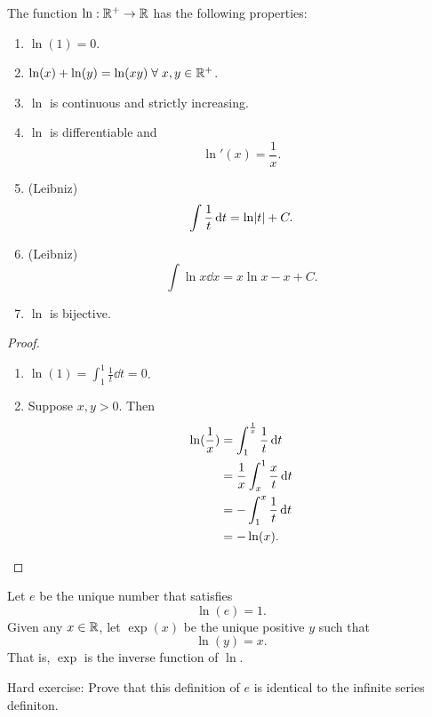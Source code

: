 \begin{thm}[]
    The function $\ln : \mathbb{R}^{+} \to \mathbb{R}$ has the following properties:
    \begin{enumerate}[label=(\alph*)]
        \item $\ln(1) = 0$.
        \item $\ln(x) + \ln(y) = \ln(xy) \;\forall\; x, y \in \mathbb{R}^{+}$.
        \item $\ln$ is continuous and strictly increasing.
        \item $\ln$ is differentiable and \[
            \ln'(x) = \frac{1}{x}.
        \]
        \item (Leibniz) \[
            \int \frac{1}{t} \dd t = \ln \abs{t} + C.
        \]
        \item (Leibniz) \[
            \int \ln x \dd x = x \ln x - x + C.
        \]
        \item $\ln$ is bijective.
    \end{enumerate}
\end{thm}
\begin{proof} \leavevmode
    \begin{enumerate}[label=(\alph*)]
        \item $\ln(1) = \int_{1}^{1} \frac{1}{t} \dd t = 0$.
        \item Suppose $x, y > 0$. Then
        \begin{align*}
            \ln(\frac{1}{x}) &= \int_{1}^{\frac{1}{x}} \frac{1}{t} \,\mathrm{d} t \\
            &= \frac{1}{x} \int_{x}^{1} \frac{x}{t} \,\mathrm{d} t \\
            &= - \int_{1}^{x} \frac{1}{t} \,\mathrm{d} t \\
            &= - \ln(x). \qedhere
        \end{align*}
    \end{enumerate}
\end{proof}

\begin{defn}[e \& Exponentiation] \label{defn:e}
    Let $e$ be the unique number that satisfies \[
        \ln(e) = 1.
    \] Given any $x \in \mathbb{R}$, let $\exp(x)$ be the unique positive $y$ such that \[
        \ln(y) = x.
    \] That is, $\exp$ is the inverse function of $\ln$.
\end{defn}

Hard exercise: Prove that this definition of $e$ is identical to the infinite series definiton.

